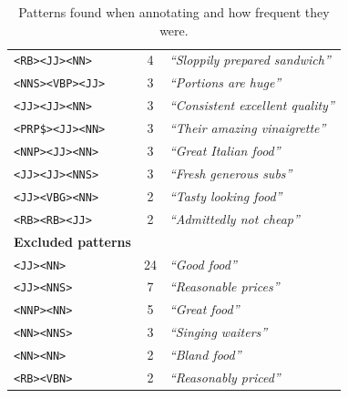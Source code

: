 \documentclass[a4paper,11pt]{kth-mag}
\begin{document}
\begin{table}[t]
\begin{tabular}{| l | c | l |}
    \texttt{<RB><JJ><NN>} & 4 & \emph{``Sloppily prepared sandwich''}\\
    \texttt{<NNS><VBP><JJ>} & 3 & \emph{``Portions are huge''}\\
    \texttt{<JJ><JJ><NN>} & 3 & \emph{``Consistent excellent quality''}\\
    \texttt{<PRP\$><JJ><NN>} & 3 & \emph{``Their amazing vinaigrette''}\\
    \texttt{<NNP><JJ><NN>} & 3 & \emph{``Great Italian food''}\\
    \texttt{<JJ><JJ><NNS>} & 3 & \emph{``Fresh generous subs''}\\
    \texttt{<JJ><VBG><NN>} & 2 & \emph{``Tasty looking food''}\\
    \texttt{<RB><RB><JJ>} & 2 & \emph{``Admittedly not cheap''}\\
    \hline
    \textbf{Excluded patterns} && \\
    \hline
    \texttt{<JJ><NN>} & 24 & \emph{``Good food''}\\
    \texttt{<JJ><NNS>} & 7 & \emph{``Reasonable prices''}\\
    \texttt{<NNP><NN>} & 5 & \emph{``Great food''}\\
    \texttt{<NN><NNS>} & 3 & \emph{``Singing waiters''}\\
    \texttt{<NN><NN>} & 2 & \emph{``Bland food''}\\
    \texttt{<RB><VBN>} & 2 & \emph{``Reasonably priced''}\\
    \hline
  \end{tabular}
  \caption{Patterns found when annotating and how frequent they were.
  }
  \label{tab:used_pos}
\end{table}
\end{document}
